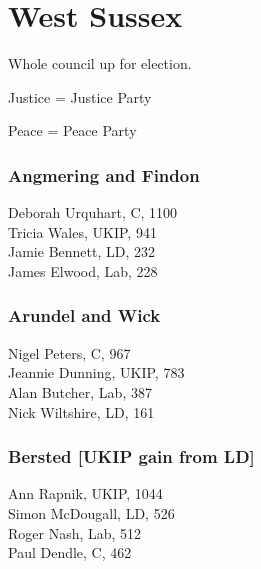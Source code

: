 \documentclass[a4paper,openany,10pt]{book}
\begin{document}
\vfill

\section{West Sussex}

Whole council up for election.

Justice = Justice Party

Peace = Peace Party



\subsubsection*{Angmering and Findon}



Deborah Urquhart, C, 1100\\
Tricia Wales, UKIP, 941\\
Jamie Bennett, LD, 232\\
James Elwood, Lab, 228\\


\subsubsection*{Arundel and Wick}



Nigel Peters, C, 967\\
Jeannie Dunning, UKIP, 783\\
Alan Butcher, Lab, 387\\
Nick Wiltshire, LD, 161\\


\subsubsection*{Bersted \hspace*{\fill}\nolinebreak[1]%
\enspace\hspace*{\fill}
[UKIP gain from LD]}



Ann Rapnik, UKIP, 1044\\
Simon McDougall, LD, 526\\
Roger Nash, Lab, 512\\
Paul Dendle, C, 462\\
\end{document}
